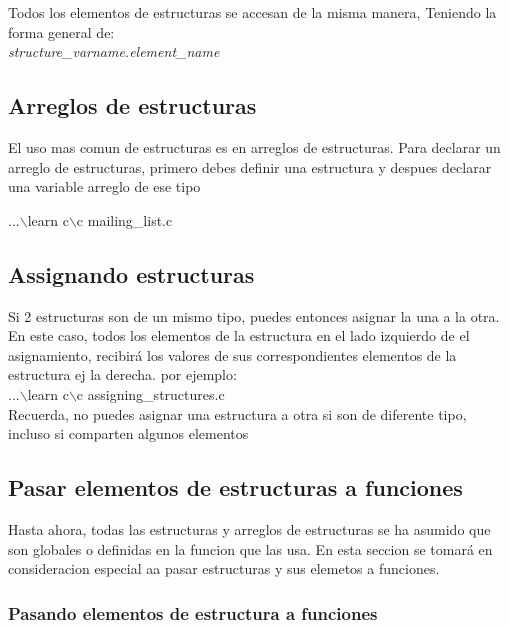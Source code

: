 \documentclass[]{article}
\begin{document}
				Todos los elementos de estructuras se accesan de la misma manera, Teniendo la forma general de:\\
			
				\textit{structure\_varname.element\_name}\\
			
			\subsection{Arreglos de estructuras}
			
			El uso mas comun de estructuras es en arreglos de estructuras. Para declarar un arreglo de estructuras, primero debes definir una estructura y despues declarar una variable arreglo de ese tipo
			
			...$\backslash$learn c$\backslash$c mailing\_list.c\\
			
			\subsection{Assignando estructuras}
			
			Si 2 estructuras son de un mismo tipo, puedes entonces asignar la una a la otra. En este caso, todos los elementos de la estructura en el lado izquierdo de el asignamiento, recibirá los valores de sus correspondientes elementos de la estructura ej la derecha. por ejemplo:\\
			
			...$\backslash$learn c$\backslash$c assigning\_structures.c\\
			
			Recuerda, no puedes asignar una estructura a otra si son de diferente tipo, incluso si comparten algunos elementos
			
			
			\subsection{Pasar elementos de estructuras a funciones}
			
			Hasta ahora, todas las estructuras y arreglos de estructuras se ha asumido que son globales o definidas en la funcion que las usa. En esta seccion se tomará en consideracion especial aa pasar estructuras y sus elemetos a funciones.
			
				\subsubsection{Pasando elementos de estructura a funciones}
				
\end{document}
